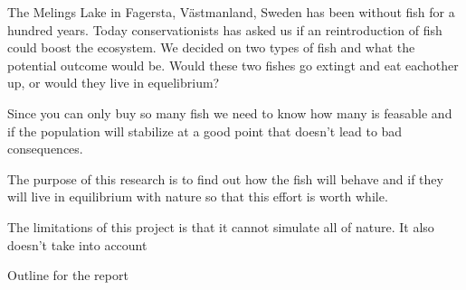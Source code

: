 \begin{flushleft}
    The Melings Lake in Fagersta, Västmanland, Sweden has been without
    fish for a hundred years. Today conservationists has asked us if
    an reintroduction of fish could boost the ecosystem. We decided on
    two types of fish and what the potential outcome would be. Would these
    two fishes go extingt and eat eachother up, or would they live in equelibrium?

\end{flushleft}

\begin{flushleft}
    Since you can only buy so many fish we need to know how many is feasable
    and if the population will stabilize at a good point that doesn't
    lead to bad consequences.

\end{flushleft}

\begin{flushleft}
    The purpose of this research is to find out how the fish will behave
    and if they will live in equilibrium with nature so that this effort
    is worth while.
\end{flushleft}

\begin{flushleft}
    The limitations of this project is that it cannot simulate all of nature.
    It also doesn't take into account
\end{flushleft}

\begin{flushleft}
    Outline for the report
\end{flushleft}